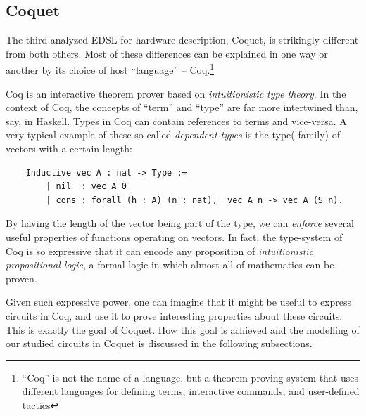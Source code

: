 \documentclass[a4paper]{article}
\begin{document}
        \subsection{Coquet}
        \label{subsec:coquet}
            The third analyzed EDSL for hardware description, Coquet\cite{coquet2011},
            is strikingly different from both others. Most of these differences can be explained in
            one way or another by its choice of host ``language'' -- Coq.\footnote{``Coq'' is not
                the name of a language, but a theorem-proving system that uses different languages
                for defining terms, interactive commands, and user-defined tactics}

            Coq is an interactive theorem prover based on \emph{intuitionistic type theory}. In the
            context of Coq, the concepts of ``term'' and ``type'' are far more intertwined than,
            say, in Haskell. Types in Coq can contain references to terms and vice-versa. A very
            typical example of these so-called \emph{dependent types} is the type(-family) of
            vectors with a certain length:
            \begin{verbatim}
    Inductive vec A : nat -> Type :=
        | nil  : vec A 0
        | cons : forall (h : A) (n : nat),  vec A n -> vec A (S n).
            \end{verbatim}

            By having the length of the vector being part of the type, we can \emph{enforce} several
            useful properties of functions operating on vectors. In fact, the type-system of Coq is
            so expressive that it can encode any proposition of \emph{intuitionistic propositional
                logic}, a formal logic in which almost all of mathematics can be proven.

            Given such expressive power, one can imagine that it might be useful to express circuits
            in Coq, and use it to prove interesting properties about these circuits. This is exactly
            the goal of Coquet. How this goal is achieved and the modelling of our studied circuits
            in Coquet is discussed in the following subsections.
\end{document}
